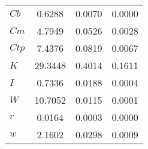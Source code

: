 \begin{center}
\begin{longtable}{lccc}
$Cb        $	 & 	       0.6288	 & 	       0.0070	 & 	       0.0000 \\ 
$Cm        $	 & 	       4.7949	 & 	       0.0526	 & 	       0.0028 \\ 
$Ctp       $	 & 	       7.4376	 & 	       0.0819	 & 	       0.0067 \\ 
$K         $	 & 	      29.3448	 & 	       0.4014	 & 	       0.1611 \\ 
$I         $	 & 	       0.7336	 & 	       0.0188	 & 	       0.0004 \\ 
$W         $	 & 	      10.7052	 & 	       0.0115	 & 	       0.0001 \\ 
$r         $	 & 	       0.0164	 & 	       0.0003	 & 	       0.0000 \\ 
$w         $	 & 	       2.1602	 & 	       0.0298	 & 	       0.0009 \\ 
\end{longtable}
 \end{center}

